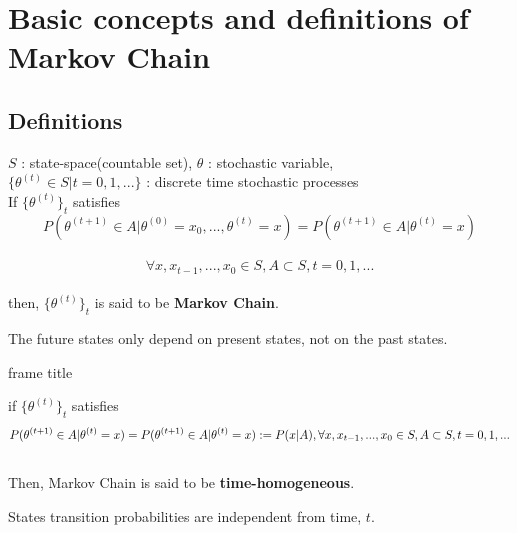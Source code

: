 
\section{Basic concepts and definitions of Markov Chain}

\subsection{Definitions}

\begin{frame}
    \begin{definition}
        $S$ : state-space(countable set),
        $\theta$ : stochastic variable, \\
         $\{\theta^{(t)} \in S |t=0,1,...\}$
         : discrete time stochastic processes \\
         If $\{\theta^{(t)}\}_t $ satisfies\\
         \[
         P(\theta^{(t+1)} \in A |\theta^{(0)} = x_0,...,\theta^{(t)} =x) 
         = P(\theta^{(t+1)} \in A  |\theta^{(t)} = x)
         \]\\
         \[\forall x,x_{t-1},...,x_{0}\in S, A \subset S, t = 0,1,...\]\\
        then,  $\{\theta^{(t)}\}_t $ is said to be \textbf{Markov Chain}. 
    \end{definition}
    \Large The future states only depend on present states, not on the past states.\\
\end{frame}

\begin{frame}{frame title}
    \begin{definition}
        if $\{\theta^{(t)}\}_t $ satisfies 
        \[
        P(\theta^{(t+1)} \in A  |\theta^{(t)} = x) 
        = P(\theta^{(t+1)} \in A  |\theta^{(t)} = x) := P(x|A), \\ 
        \forall x,x_{t-1},...,x_{0}\in S, A \subset S, t = 0,1,...
        \]\\
        Then, Markov Chain is said to be \textbf{time-homogeneous}.
    \end{definition}
    
    
    \Large States transition probabilities are independent from time, $t$.
\end{frame}


